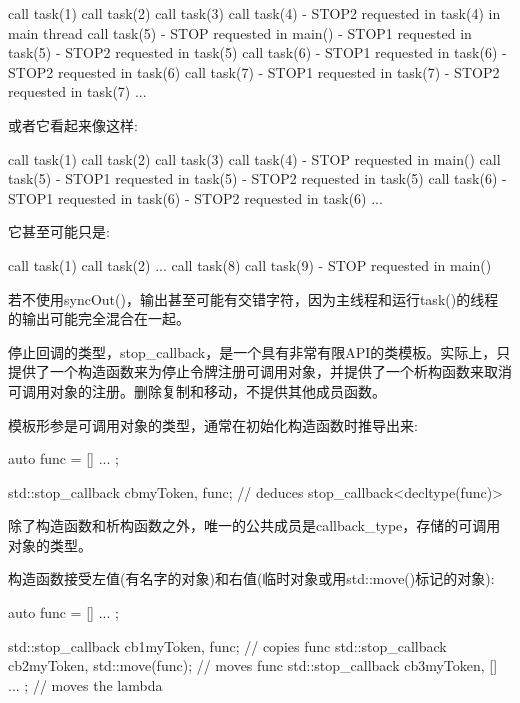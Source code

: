 \begin{shell}
call task(1)
call task(2)
call task(3)
call task(4)
- STOP2 requested in task(4) in main thread
call task(5)
- STOP requested in main()
- STOP1 requested in task(5)
- STOP2 requested in task(5)
call task(6)
- STOP1 requested in task(6)
- STOP2 requested in task(6)
call task(7)
- STOP1 requested in task(7)
- STOP2 requested in task(7)
...
\end{shell}

或者它看起来像这样:

\begin{shell}
call task(1)
call task(2)
call task(3)
call task(4)
- STOP requested in main()
call task(5)
- STOP1 requested in task(5)
- STOP2 requested in task(5)
call task(6)
- STOP1 requested in task(6)
- STOP2 requested in task(6)
...
\end{shell}

它甚至可能只是:

\begin{shell}
call task(1)
call task(2)
...
call task(8)
call task(9)
- STOP requested in main()
\end{shell}

若不使用syncOut()，输出甚至可能有交错字符，因为主线程和运行task()的线程的输出可能完全混合在一起。


停止回调的类型，stop\_callback，是一个具有非常有限API的类模板。实际上，只提供了一个构造函数来为停止令牌注册可调用对象，并提供了一个析构函数来取消可调用对象的注册。删除复制和移动，不提供其他成员函数。

模板形参是可调用对象的类型，通常在初始化构造函数时推导出来:

\begin{cpp}
auto func = [] { ... };

std::stop_callback cb{myToken, func}; // deduces stop_callback<decltype(func)>
\end{cpp}

除了构造函数和析构函数之外，唯一的公共成员是callback\_type，存储的可调用对象的类型。

构造函数接受左值(有名字的对象)和右值(临时对象或用std::move()标记的对象):

\begin{cpp}
auto func = [] { ... };

std::stop_callback cb1{myToken, func}; // copies func
std::stop_callback cb2{myToken, std::move(func)}; // moves func
std::stop_callback cb3{myToken, [] { ... }}; // moves the lambda
\end{cpp}

